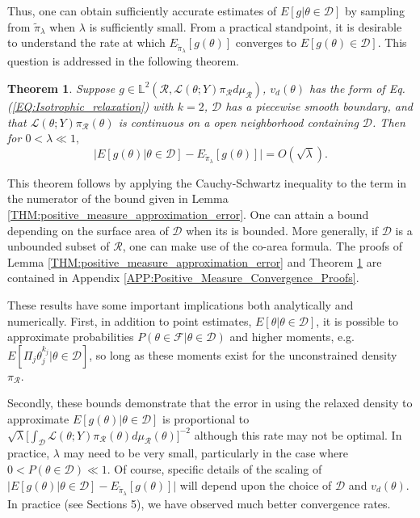 \documentclass[10pt,fleqn]{article}
\newtheorem{theorem}{Theorem}
\DeclareMathOperator{\1}{\mathbbm{1}}
\begin{document}
{Thus, one can obtain sufficiently accurate estimates of $E[g|\theta\in\mathcal{D}]$ by sampling from $\tilde{\pi}_\lambda$ when $\lambda$ is sufficiently small.  From a practical standpoint, it is desirable to understand the rate at which $E_{\tilde{\pi}_\lambda}[g(\theta)] $ converges to $E[g(\theta)\in\mathcal{D}]$. This question is addressed in the following theorem.

\begin{theorem}
\label{THM:Positive_measure_convergence_rate}
Suppose $g \in  \mathbb{L}^2(\mathcal{R}, \mathcal{L}(\theta;Y)\pi_\mathcal{R}d\mu_\mathcal{R})$, $v_d(\theta)$ has the form of Eq. (\ref{EQ:Isotrophic_relaxation}) with $k=2$, $\mathcal{D}$ has a piecewise smooth boundary, and that $\mathcal{L}(\theta;Y)\pi_\mathcal{R}(\theta)$ is continuous on a open neighborhood containing $\mathcal{D}$.  Then for $0<\lambda \ll 1,$
$$ \bigg|E[g(\theta) |\theta\in\mathcal{D}] - E_{\tilde{\pi}_\lambda}[g(\theta)]   \bigg| = O(\sqrt{\lambda}).  $$
\end{theorem}
This theorem follows by applying the Cauchy-Schwartz inequality to the term in the numerator of the bound given in Lemma \ref{THM:positive_measure_approximation_error}.  One can attain a bound depending on the surface area of $\mathcal{D}$ when its is bounded.  More generally, if $\mathcal{D}$ is a unbounded subset of $\mathcal{R}$, one can make use of the co-area formula\cite{federer2014geometric, diaconis2013manifold}. The proofs of Lemma \ref{THM:positive_measure_approximation_error} and Theorem \ref{THM:Positive_measure_convergence_rate} are contained in Appendix \ref{APP:Positive_Measure_Convergence_Proofs}.

These results have some important implications both analytically and numerically.  First, in addition to point estimates, $E[\theta|\theta\in\mathcal{D}]$, it is possible to approximate probabilities $P(\theta \in \mathcal{F}|\theta \in \mathcal{D})$ and higher moments, e.g. $E[\Pi_j \theta_j^{k_j} |\theta\in\mathcal{D}]$, so long as these moments exist for the unconstrained density $\pi_\mathcal{R}.$ 

Secondly, these bounds demonstrate that the error in using the relaxed density to approximate $E[g(\theta)|\theta\in\mathcal{D}]$ is proportional to $\sqrt{\lambda} [\int_\mathcal{D}\mathcal{L}(\theta; Y)  \pi_\mathcal{R}(\theta)d\mu_\mathcal{R}(\theta)\big]^{-2}$ although this rate may not be optimal.  In practice, $\lambda$ may need to be very small, particularly in the case where $0<P(\theta\in\mathcal{D})\ll 1.$ Of course, specific details of the scaling of $\bigg|E[g(\theta) |\theta\in\mathcal{D}] - E_{\tilde{\pi}_\lambda}[g(\theta)]   \bigg|$ will depend upon the choice of $\mathcal{D}$ and $v_d(\theta)$. In practice (see Sections 5), we have observed much better convergence rates.

}
\end{document}

